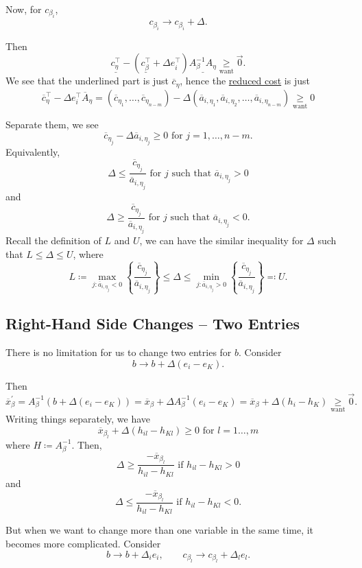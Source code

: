 Now, for \(c_{\beta_{i}}\),
\[
	c_{\beta_{i}}\to c_{\beta_{i}}+\Delta.
\]

Then
\[
	\underline{c_{\eta}^{\top}} - (\underline{c_{\beta}^{\top}} + \Delta e_{i}^{\top}) \underline{A^{-1}_{\beta}A_{\eta}}\underset{\text{want}}{\geq} \vec{0}.
\]
We see that the underlined part is just \(\overline{c}_{\eta}\), hence the \hyperref[def:reduced-cost]{reduced cost} is just
\[
	\overline{c}_{\eta}^{\top} - \Delta e_{i}^{\top}\overline{A}_{\eta} = (\overline{c}_{\eta_1}, \ldots , \overline{c}_{\eta_{n-m}}) - \Delta(\overline{a}_{i, \eta_1}, \overline{a}_{i, \eta_2}, \ldots , \overline{a}_{i, \eta_{n-m}})\underset{\text{want}}{\geq} 0
\]

Separate them, we see
\[
	\overline{c}_{\eta_{j}} - \Delta \overline{a}_{i, \eta_{j}} \geq 0 \text{ for }j = 1, \ldots , n-m.
\]
Equivalently,
\[
	\Delta\leq \frac{\overline{c}_{\eta_{j}}}{\overline{a}_{i, \eta_{j}}} \text{ for }j \text{ such that }\overline{a}_{i, \eta_{j}}>0
\]
and
\[
	\Delta\geq \frac{\overline{c}_{\eta_{j}}}{\overline{a}_{i, \eta_{j}}} \text{ for }j \text{ such that }\overline{a}_{i, \eta_{j}}<0.
\]
Recall the definition of \(L\) and \(U\), we can have the similar inequality for \(\Delta\) such that \(L\leq \Delta\leq U\), where
\[
	L \coloneqq \max_{j\colon \overline{a}_{i, \eta_{j}} < 0}\left\{ \frac{\overline{c}_{\eta_{j}}}{\overline{a}_{i, \eta_{j}}} \right\} \leq \Delta \leq \min_{j\colon \overline{a}_{i, \eta_{j}} > 0}\left\{ \frac{\overline{c}_{\eta_{j}}}{\overline{a}_{i, \eta_{j}}} \right\} \eqqcolon U.
\]

\subsection{Right-Hand Side Changes -- Two Entries}
There is no limitation for us to change two entries for \(b\). Consider
\[
	b\to b+\Delta(e_{i} - e_{K}).
\]

Then
\[
	\overline{x}_{\beta}^\prime
	= A_{\beta}^{-1}(b+\Delta(e_{i} - e_K))
	= \overline{x}_{\beta}+\Delta A^{-1}_{\beta}(e_{i} - e_K)
	= \overline{x}_{\beta}+\Delta(h_{i} - h_K)
	\underset{\text{want}}{\geq} \vec{0}.
\]
Writing things separately, we have
\[
	\overline{x}_{\beta_l} + \Delta(h_{il} - h_{Kl}) \geq 0 \text{ for }l = 1\ldots , m
\]
where \(H\coloneqq A^{-1}_{\beta}\). Then,
\[
	\Delta\geq \frac{-\overline{x}_{\beta_l}}{h_{il} - h_{Kl}} \text{ if }h_{il} - h_{Kl} > 0
\]
and
\[
	\Delta\leq \frac{-\overline{x}_{\beta_l}}{h_{il} - h_{Kl}} \text{ if }h_{il} - h_{Kl} < 0.
\]

But when we want to change more than one variable in the same time, it becomes more complicated. Consider
\[
	b\to b+\Delta_{i}e_{i}, \qquad c_{\beta_l}\to c_{\beta_l} + \Delta_l e_l.
\]

